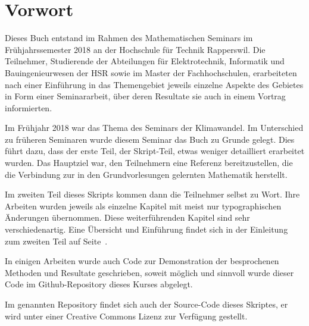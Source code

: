 %
%
%
\chapter*{Vorwort}
\rhead{}
Dieses Buch entstand im Rahmen des Mathematischen Seminars
im Frühjahrssemester 2018 an der Hochschule für Technik Rapperswil.
Die Teilnehmer, Studierende der Abteilungen für Elektrotechnik,
Informatik und Bauingenieurwesen der HSR sowie im Master der Fachhochschulen,
erarbeiteten nach einer Einführung in das Themengebiet jeweils
einzelne Aspekte des Gebietes in Form einer Seminararbeit, über
deren Resultate sie auch in einem Vortrag informierten. 

Im Frühjahr 2018 war das Thema des Seminars der Klimawandel.
Im Unterschied zu früheren Seminaren wurde diesem Seminar das Buch
\cite{skript:kaperengler}
zu Grunde gelegt.
Dies führt dazu, dass der erste Teil, der Skript-Teil, etwas weniger
detailliert erarbeitet wurden.
Das Hauptziel war, den Teilnehmern eine Referenz bereitzustellen,
die die Verbindung zur in den Grundvorlesungen gelernten
Mathematik herstellt.

Im zweiten Teil dieses Skripts kommen dann die Teilnehmer selbst zu Wort.
Ihre Arbeiten wurden jeweils als einzelne
Kapitel mit meist nur typographischen Änderungen übernommen.
Diese weiterführenden Kapitel sind sehr verschiedenartig.
Eine Übersicht und Einführung findet sich in der Einleitung
zum zweiten Teil auf Seite~\pageref{skript:uebersicht}.

In einigen Arbeiten wurde auch Code zur Demonstration der 
besprochenen Methoden und Resultate geschrieben, soweit
möglich und sinnvoll wurde dieser Code im Github-Repository
dieses Kurses
\cite{skript:repo}
abgelegt.

Im genannten Repository findet sich auch der Source-Code dieses
Skriptes, er wird unter einer Creative Commons Lizenz
zur Verfügung gestellt.




